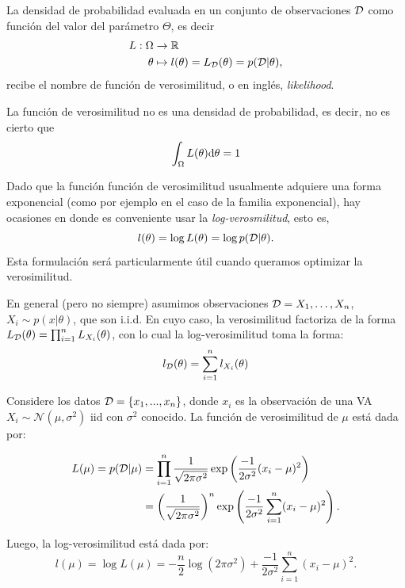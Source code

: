 \begin{definition}
La densidad de probabilidad evaluada en un conjunto de observaciones ${\mathcal D}$ como función del valor del parámetro $\Theta$, es decir 
\begin{align}
    L: \Omega &\rightarrow {\mathbb R}\\
    \theta&\mapsto l(\theta) = L_{\mathcal D}(\theta) = p({\mathcal D}|\theta),
\end{align}
recibe el nombre de función de verosimilitud, o en inglés, \emph{likelihood}. 
\label{función_verosimilitud}
\end{definition}
\begin{remark}
La función de verosimilitud no es una densidad de probabilidad, es decir, no es cierto que
\begin{equation}
    \int_\Omega L(\theta){\text{d}}\theta = 1
\end{equation}
\end{remark}

\begin{remark}
Dado que la función función de verosimilitud usualmente adquiere una forma exponencial (como por ejemplo en el caso de la familia exponencial), hay ocasiones en donde es conveniente usar la \emph{log-verosmilitud}, esto es, 
\begin{equation}
l(\theta)=\log L(\theta)=\log p({\mathcal D}|\theta).
\end{equation}
Esta formulación será particularmente útil cuando queramos optimizar la verosimilitud. 
\end{remark}

\begin{remark}
En general (pero no siempre) asumimos observaciones ${\mathcal D} = {X_1,\ldots,X_n}$, $X_i\sim p(x|\theta)$, que son i.i.d. En cuyo caso, la verosimilitud factoriza de la forma $L_{\mathcal D}(\theta) = \prod_{i=1}^n L_{X_i}(\theta)$, con lo cual la log-verosimilitud toma la forma: 
\begin{equation}
l_{\mathcal D}(\theta) = \sum_{i=1}^nl_{X_i}(\theta)
\end{equation}
\end{remark}

\begin{example}
Considere los datos ${\mathcal D} = \{x_1,...,x_n\}$, donde $x_i$ es la observación de una VA $X_i\sim \mathcal{N}(\mu,\sigma^2)$ iid con $\sigma^2$ conocido. La función  de verosimilitud de $\mu$ está dada por:

\begin{align}
L(\mu)=p({\mathcal D}|\mu)&=\prod_{i=1}^{n} \frac{1}{\sqrt{2 \pi \sigma^{2}}} 
\exp\left(\frac{-1}{2\sigma^{2}}(x_i-\mu)^{2}\right)\nonumber\\
&= \left(\frac{1}{\sqrt{2 \pi \sigma^{2}}}\right)^{n} \exp\left(\frac{-1}{2 \sigma^{2}} \sum_{i=1}^{n} (x_i - \mu )^{2}\right).
\end{align}

Luego, la log-verosimilitud está dada por:
\begin{equation}
    l(\mu)= \log L(\mu) = -\frac{n}{2} \log(2 \pi \sigma^{2}) + \frac{-1}{2\sigma^{2}} \sum_{i=1}^{n} (x_i - \mu )^{2}.
\end{equation}

\end{example}

